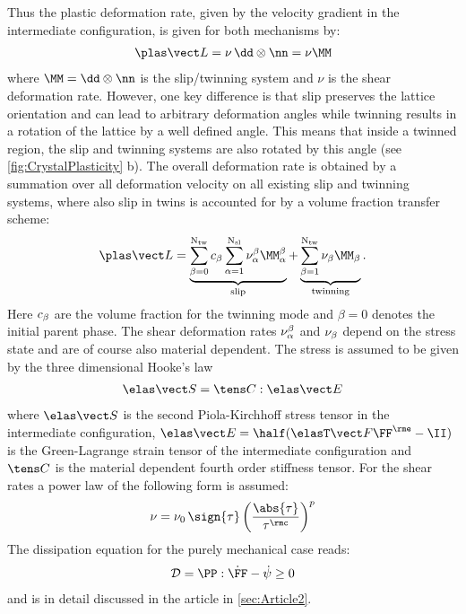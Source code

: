 Thus the plastic deformation rate, given by the velocity gradient in the intermediate configuration, is given for both mechanisms by:
\begin{align}
  \LLp = \nu \, \dd\otimes\nn = \nu\MM
\end{align}
where $\MM=\dd\otimes\nn$ is the slip/twinning system and $\nu$ is the shear deformation rate. However, one key difference is that slip preserves the lattice orientation and can lead to arbitrary deformation angles while twinning results in a rotation of the lattice by a well defined angle. This means that inside a twinned region, the slip and twinning systems are also rotated by this angle (see \cref{fig:CrystalPlasticity} b). The overall deformation rate is obtained by a summation over all deformation velocity on all existing slip and twinning systems, where also slip in twins is accounted for by a volume fraction transfer scheme\supercite{kalidindi1998incorporation}:  
\begin{equation}
  \LLp = \underbrace{\sumbO \cb \sumaI \nuab \MMab}_{\text{slip}} + \underbrace{\sumbI \nub \MMb}_{\text{twinning}}.
\end{equation}
Here $c_{\beta}$ are the volume fraction for the twinning mode and $\beta=0$ denotes the initial parent phase. The shear deformation rates $\nu_{\alpha}^{\beta}$ and $\nu_{\beta}$ depend on the stress state and are of course also material dependent. The stress is assumed to be given by the three dimensional Hooke's law
\begin{align}
  \SSe = \CCCC:\EEe
\end{align}
where $\SSe$ is the second Piola-Kirchhoff stress tensor in the intermediate configuration, \mbox{$\EEe=\half(\FFeT\FFe-\II)$} is the Green-Lagrange strain tensor of the intermediate configuration and $\CCCC$ is the material dependent fourth order stiffness tensor. For the shear rates a power law of the following form is assumed:
\begin{align}
    \nu = \nu_0 \, \sign{\tau} \left( \frac{\abs{\tau}}{\tau^\rmc} \right)^{p}
    \label{eq:powerlaw}
\end{align}
The dissipation equation for the purely mechanical case reads:
\begin{align} 
  \mathcal{D} = \PP:\dot\FF - \dot\psi \geq 0
\end{align}
and is in detail discussed in the article in \cref{sec:Article2}. 


